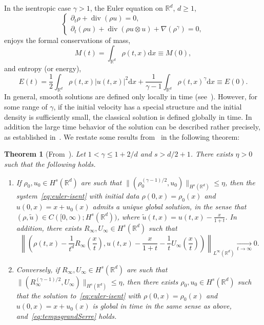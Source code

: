 \documentclass[10pt]{amsart}
\newtheorem{theo}{Theorem}[section]
\theoremstyle{definition}\newtheorem{defi}[theo]{Definition}\newtheorem{rema}[theo]{Remark}\newtheorem{exam}[theo]{Example}\newtheorem{exem}[theo]{Example}\newtheorem{nota}[theo]{Notation}
\DeclareMathOperator{\DIV}{div}
\newcommand*\R{\mathbb{R}}
\newcommand*\dd {\mathrm{d}}
\newcommand*\<{\left\langle}
\renewcommand*\>{\right\rangle}
\renewcommand*\le{\leqslant}
\renewcommand*\ge{\geqslant}
\newcommand*\Tend[2]{\mathop{\longrightarrow}\limits_{#1\rightarrow#2}}
\begin{document}
In the isentropic case $\gamma>1$, the Euler equation on $\R^d$, $d\ge 1$,
\begin{equation}\label{eq:euler-isent}
\begin{cases}
\partial_t \rho+\DIV\left(\rho u\right)=0,\\
\partial_t (\rho u) +\DIV(\rho u\otimes u)+\nabla
\left(\rho^\gamma\right)= 0,
\end{cases}
\end{equation}
enjoys the formal conservations of mass,
\begin{equation*}
M(t) =\int_{\R^d}\rho(t,x)\dd x\equiv M(0),
\end{equation*}
and entropy (or energy),
\begin{equation*}
E(t) = \frac{1}{2}\int_{\R^d} \rho (t,x) |u(t,x)|^2 \dd x+\frac{1}{\gamma-1}\int_{\R^d}\rho(t,x)^\gamma
\dd x \equiv E(0).
\end{equation*}
In general, smooth solutions are defined only locally in time (see~\cite{MUK86,JYC90,Xin98}). However, for some range of $\gamma$, if the initial velocity has a special structure and the initial density is sufficiently small, the classical solution is defined globally in time. In addition the large time behavior of the solution can be described rather precisely, as established in~\cite{Serre97}. We restate some results from~\cite{Serre97} in the following theorem:
\begin{theo}[From~\cite{Serre97}]\label{theo:serre}
Let $1<\gamma\le 1+2/d$ and $s>d/2+1$. There exists $\eta>0$ such that the following holds.
\begin{enumerate}
\item \label{1.1.1} If $\rho_0,u_0\in H^s(\R^d)$ are such that $\|(\rho_0^{(\gamma-1)/2},u_0)\|_{H^s(\R^d)}\le \eta $, then the system~\eqref{eq:euler-isent} with initial data $\rho(0,x) = \rho_0(x)$ and $u(0,x) = x + u_0(x)$ admits a unique global solution, in the sense that $(\rho,\tilde u)\in C([0,\infty);H^s(\R^d))$, where $\tilde u(t,x)=u(t,x)-\frac{x}{1+t}$. In addition, there exists $R_\infty,U_\infty\in H^s(\R^d)$ such that
\begin{equation}\label{eq:tempsgrandSerre}
\left\| \left(\rho (t,x)-\frac{1}{t^d}R_\infty\left(\frac{x}{t}\right),u(t,x) -\frac{x}{1+t}-\frac{1}{t}U_\infty
\left(\frac{x}{t}\right)\right)\right\|_{L^\infty(\R^d)}\Tend t \infty 0.
\end{equation}
\item \label{1.1.2} Conversely, if $R_\infty,U_\infty\in H^s(\R^d)$ are such that $\|(R_\infty^{(\gamma-1)/2},U_\infty)\|_{H^s(\R^d)}\le \eta$, then there exists $\rho_0,u_0\in H^s(\R^d)$ such that the solution to~\eqref{eq:euler-isent} with $ \rho(0,x)=\rho_0(x)$ and $ u(0,x) = x+u_0(x)$ is global in time in the same sense as above, and~\eqref{eq:tempsgrandSerre} holds.
\end{enumerate}
\end{theo}
\end{document}
